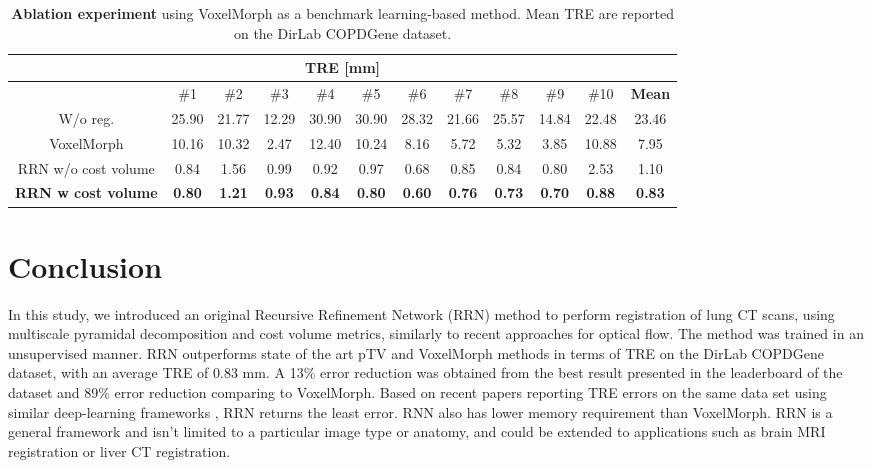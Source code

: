 \documentclass[runningheads]{llncs}
\begin{document}
\begin{table}\centering
\caption{ \textbf{Ablation experiment} using VoxelMorph as a benchmark learning-based method. Mean TRE are reported on the DirLab COPDGene dataset.}\label{tab2}
\begin{tabular}{|c|c| c| c| c| c| c| c| c| c| c |c|}
\hline
\multicolumn{12}{|c|}{TRE [mm]} \\
\hline
 & \#1 & \#2 & \#3 & \#4 & \#5 & \#6 & \#7 & \#8 & \#9 & \#10 & \textbf{Mean}\\
\hline
W/o reg. &  25.90 &21.77&12.29&30.90&30.90&28.32&21.66&25.57&14.84&22.48 & 23.46\\
\hline
VoxelMorph &  10.16 & 10.32 & 2.47 & 12.40 & 10.24 & 8.16 & 5.72 & 5.32 & 3.85 & 10.88 & 7.95\\\hline
RRN w/o cost volume &  0.84 & 1.56 & 0.99 & 0.92 & 0.97 & 0.68 & 0.85 & 0.84 & 0.80 & 2.53 & 1.10\\\hline
\textbf{RRN w cost volume} &  \textbf{0.80} & \textbf{1.21} & \textbf{0.93} & \textbf{0.84} & \textbf{0.80} & \textbf{0.60} & \textbf{0.76} & \textbf{0.73} & \textbf{0.70} & \textbf{0.88} & \textbf{0.83}\\\hline
\end{tabular}
\end{table}


\section{Conclusion}
 In this study, we introduced an original Recursive Refinement Network (RRN) method to perform registration of lung CT scans, using multiscale pyramidal decomposition and cost volume metrics, similarly to recent approaches for optical flow. The method was trained in an unsupervised manner. 
 RRN outperforms  state of the art pTV and VoxelMorph methods in terms of TRE on the DirLab COPDGene dataset, with an average TRE of 0.83 mm. A 13\% error reduction was obtained from the best result presented in the leaderboard of the dataset and 89\% error reduction comparing to VoxelMorph. Based on recent papers reporting TRE errors on the same data set using similar deep-learning frameworks \cite{anasCTScanRegistration2020,hansenLearningDeformablePoint2019,sokooti3DConvolutionalNeural2019a}, RRN returns the least error. RNN also has lower memory requirement than VoxelMorph. RRN is a general framework and isn't limited to a particular image type or anatomy, and could be extended to applications such as brain MRI registration or liver CT registration. 

 



\end{document}
